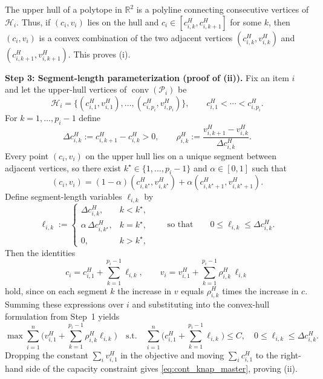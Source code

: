 \documentclass[11pt, a4paper]{article}
\theoremstyle{plain}
\theoremstyle{definition}
\theoremstyle{remark}
\begin{document}
The upper hull of a polytope in $\mathbb R^2$ is a polyline connecting consecutive vertices of $\mathcal H_i$.
Thus, if $(c_i,v_i)$ lies on the hull and $c_i\in[c^H_{i,k},c^H_{i,k+1}]$ for some $k$, then
$(c_i,v_i)$ is a convex combination of the two adjacent vertices
$(c^H_{i,k},v^H_{i,k})$ and $(c^H_{i,k+1},v^H_{i,k+1})$. This proves (i).

\textbf{Step 3: Segment-length parameterization (proof of (ii)).}
Fix an item $i$ and let the upper-hull vertices of $\operatorname{conv}(\mathcal P_i)$ be
\[
\mathcal H_i=\{(c^H_{i,1},v^H_{i,1}),\dots,(c^H_{i,p_i},v^H_{i,p_i})\},
\qquad c^H_{i,1}<\cdots<c^H_{i,p_i}.
\]
For $k=1,\dots,p_i-1$ define
\[
\Delta c^H_{i,k}:=c^H_{i,k+1}-c^H_{i,k}>0,
\qquad
\rho^H_{i,k}:=\frac{v^H_{i,k+1}-v^H_{i,k}}{\Delta c^H_{i,k}}.
\]
Every point $(c_i,v_i)$ on the upper hull lies on a unique segment between adjacent vertices, so there exist
$k^\star\in\{1,\dots,p_i-1\}$ and $\alpha\in[0,1]$ such that
\[
(c_i,v_i)=(1-\alpha)(c^H_{i,k^\star},v^H_{i,k^\star})+\alpha(c^H_{i,k^\star+1},v^H_{i,k^\star+1}).
\]
Define segment-length variables $\ell_{i,k}$ by
\[
\ell_{i,k}:=
\begin{cases}
\Delta c^H_{i,k}, & k<k^\star,\\
\alpha\,\Delta c^H_{i,k^\star}, & k=k^\star,\\
0, & k>k^\star,
\end{cases}
\qquad\text{so that}\qquad 0\le \ell_{i,k}\le \Delta c^H_{i,k}.
\]
Then the identities
\[
c_i=c^H_{i,1}+\sum_{k=1}^{p_i-1}\ell_{i,k},
\qquad
v_i=v^H_{i,1}+\sum_{k=1}^{p_i-1}\rho^H_{i,k}\,\ell_{i,k}
\]
hold, since on each segment $k$ the increase in $v$ equals $\rho^H_{i,k}$ times the increase in $c$.
Summing these expressions over $i$ and substituting into the convex-hull formulation from Step~1 yields
\[
\max \sum_{i=1}^n \Big(v^H_{i,1}+\sum_{k=1}^{p_i-1}\rho^H_{i,k}\ell_{i,k}\Big)
\quad \text{s.t.}\quad
\sum_{i=1}^n \Big(c^H_{i,1}+\sum_{k=1}^{p_i-1}\ell_{i,k}\Big)\le C,\quad
0\le \ell_{i,k}\le \Delta c^H_{i,k}.
\]
Dropping the constant $\sum_i v^H_{i,1}$ in the objective and moving $\sum_i c^H_{i,1}$ to the right-hand side of the capacity constraint
gives \eqref{eq:cont_knap_master}, proving (ii).
\end{document}

